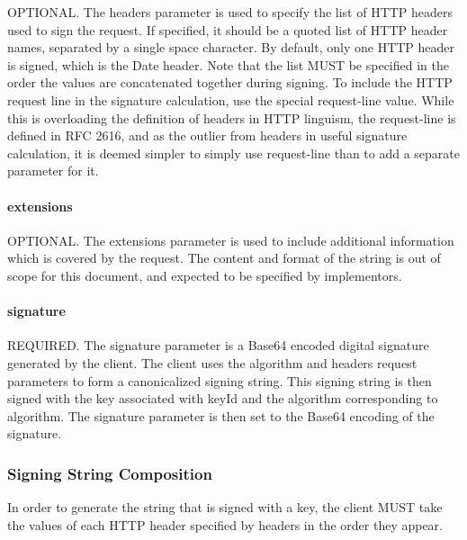 O\+P\+T\+I\+O\+N\+AL. The {\ttfamily headers} parameter is used to specify the list of H\+T\+TP headers used to sign the request. If specified, it should be a quoted list of H\+T\+TP header names, separated by a single space character. By default, only one H\+T\+TP header is signed, which is the {\ttfamily Date} header. Note that the list M\+U\+ST be specified in the order the values are concatenated together during signing. To include the H\+T\+TP request line in the signature calculation, use the special {\ttfamily request-\/line} value. While this is overloading the definition of {\ttfamily headers} in H\+T\+TP linguism, the request-\/line is defined in R\+FC 2616, and as the outlier from headers in useful signature calculation, it is deemed simpler to simply use {\ttfamily request-\/line} than to add a separate parameter for it.

\paragraph*{extensions}

O\+P\+T\+I\+O\+N\+AL. The {\ttfamily extensions} parameter is used to include additional information which is covered by the request. The content and format of the string is out of scope for this document, and expected to be specified by implementors.

\paragraph*{signature}

R\+E\+Q\+U\+I\+R\+ED. The {\ttfamily signature} parameter is a {\ttfamily Base64} encoded digital signature generated by the client. The client uses the {\ttfamily algorithm} and {\ttfamily headers} request parameters to form a canonicalized {\ttfamily signing string}. This {\ttfamily signing string} is then signed with the key associated with {\ttfamily key\+Id} and the algorithm corresponding to {\ttfamily algorithm}. The {\ttfamily signature} parameter is then set to the {\ttfamily Base64} encoding of the signature.

\subsubsection*{Signing String Composition}

In order to generate the string that is signed with a key, the client M\+U\+ST take the values of each H\+T\+TP header specified by {\ttfamily headers} in the order they appear.



